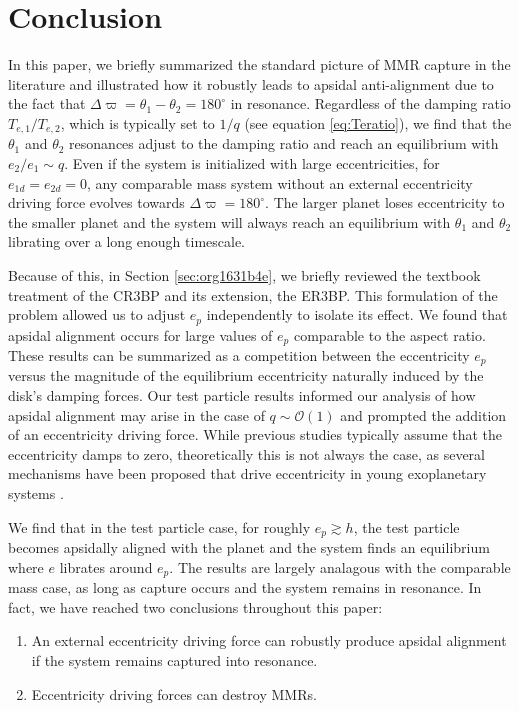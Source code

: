 \documentclass[usenatbib,twocolumn]{mnras}
\begin{document}
\section{Conclusion}
\label{sec:org45c28de}
In this paper, we briefly summarized the standard picture of MMR
capture in the literature and illustrated how it robustly leads to
apsidal anti-alignment due to the fact that
\(\Delta\varpi=\theta_1-\theta_2=180^\circ\) in resonance.  Regardless
of the damping ratio \(T_{e,1}/T_{e,2}\), which is typically set to
\(1/q\) (see equation \eqref{eq:Teratio}), we find that the \(\theta_1\) and
\(\theta_2\) resonances adjust to the damping ratio and reach an
equilibrium with \(e_2/e_1\sim q\).  Even if the system is initialized
with large eccentricities, for \(e_{1d}=e_{2d}=0\), any comparable mass
system without an external eccentricity driving force evolves towards
\(\Delta\varpi=180^\circ\). The larger planet loses eccentricity to the
smaller planet and the system will always reach an equilibrium with
\(\theta_1\) and \(\theta_2\) librating over a long enough timescale.

Because of this, in Section \ref{sec:org1631b4e}, we briefly reviewed
the textbook treatment of the CR3BP and its extension, the ER3BP.
This formulation of the problem allowed us to adjust \(e_p\)
independently to isolate its effect.  We found that apsidal alignment
occurs for large values of \(e_p\) comparable to the aspect ratio. These
results can be summarized as a competition between the eccentricity
\(e_p\) versus the magnitude of the equilibrium eccentricity naturally
induced by the disk's damping forces.  Our test particle results
informed our analysis of how apsidal alignment may arise in the case
of \(q\sim\mathcal{O}(1)\) and prompted the addition of an eccentricity
driving force.  While previous studies typically assume that the
eccentricity damps to zero, theoretically this is not always the case,
as several mechanisms have been proposed that drive eccentricity in
young exoplanetary systems
\citep{ragusa17_eccen_evolut_durin_planet_disc_inter,goldreich03_eccen_evolut_planet_gaseous_disks,teyssandier17_secul_evolut_eccen_protop_discs}.

We find that in the test particle case, for roughly \(e_p \gtrsim h\),
the test particle becomes apsidally aligned with the planet and the
system finds an equilibrium where \(e\) librates around \(e_p\).  The
results are largely analagous with the comparable mass case, as long
as capture occurs and the system remains in resonance.  In fact, we
have reached two conclusions throughout this paper:
\begin{enumerate}[label=\arabic*.]
  \item An external eccentricity driving force can robustly produce
apsidal alignment if the system remains captured into resonance.
  \item Eccentricity driving forces can destroy MMRs.
\end{enumerate}
\end{document}
